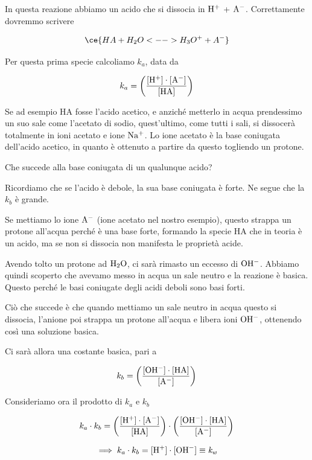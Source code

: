 
In questa reazione abbiamo un acido che si dissocia in $\rm H^+$ + $\rm A^-$. Correttamente dovremmo scrivere

$$\ce{HA + H_2O <--> H_3O^+ + A^-}$$

Per questa prima specie calcoliamo $k_a$, data da

$$k_a = \left( \rm \frac{[H^+] \cdot [A^-]}{[HA]} \right)$$

Se ad esempio HA fosse l'acido acetico, e anziché metterlo in acqua prendessimo un suo sale come l'acetato di sodio, quest'ultimo, come tutti i sali, si dissocerà totalmente in ioni acetato e ione $\rm Na^+$. Lo ione acetato è la base coniugata dell'acido acetico, in quanto è ottenuto a partire da questo togliendo un protone.

Che succede alla base coniugata di un qualunque acido?

Ricordiamo che se l'acido è debole, la sua base coniugata è forte. Ne segue che la $k_b$ è grande.

\vspace{0.2cm}

\vspace{0.2cm}Se mettiamo lo ione $\rm A^-$ (ione acetato nel nostro esempio), questo strappa un protone all'acqua perché è una base forte, formando la specie HA che in teoria è un acido, ma se non si dissocia non manifesta le proprietà acide.

Avendo tolto un protone ad $\rm H_2O$, ci sarà rimasto un eccesso di $\rm OH^-$. Abbiamo quindi scoperto che avevamo messo in acqua un sale neutro e la reazione è basica. Questo perché le basi coniugate degli acidi deboli sono basi forti.

Ciò che succede è che quando mettiamo un sale neutro in acqua questo si dissocia, l'anione poi strappa un protone all'acqua e libera ioni $\rm OH^-$, ottenendo così una soluzione basica.

Ci sarà allora una costante basica, pari a

$$k_b = \left( \rm \frac{[OH^-] \cdot [HA]}{[A^-]} \right)$$

Consideriamo ora il prodotto di $k_a$ e $k_b$

$$k_a \cdot k_b = \left( \rm \frac{[H^+] \cdot [A^-]}{[HA]} \right) \cdot \left( \rm \frac{[OH^-] \cdot [HA]}{[A^-]} \right)$$

$$\implies k_a \cdot k_b = \rm [H^+] \cdot [OH^-] \equiv \textit{k}_\textit{w}$$

